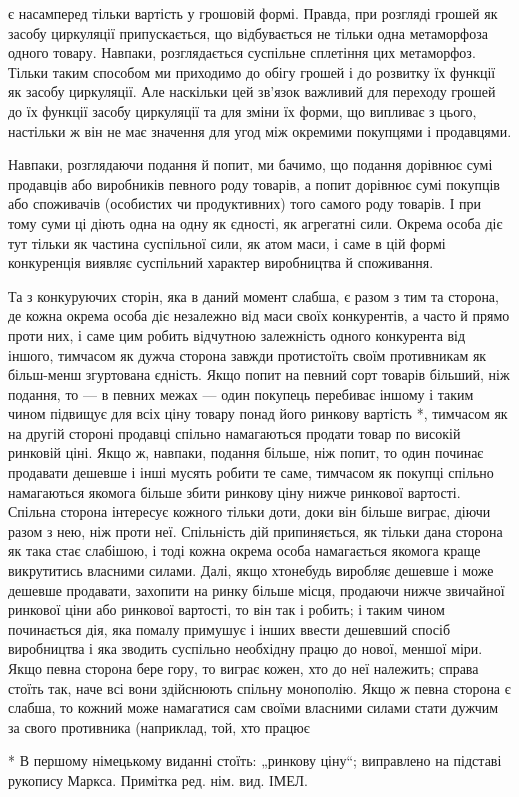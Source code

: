 є насамперед тільки вартість у грошовій формі. Правда, при
розгляді грошей як засобу циркуляції припускається, що відбувається
не тільки одна метаморфоза одного товару. Навпаки,
розглядається суспільне сплетіння цих метаморфоз. Тільки
таким способом ми приходимо до обігу грошей і до розвитку їх
функції як засобу циркуляції. Але наскільки цей зв’язок важливий
для переходу грошей до їх функції засобу циркуляції та
для зміни їх форми, що випливає з цього, настільки ж він не
має значення для угод між окремими покупцями і продавцями.

Навпаки, розглядаючи подання й попит, ми бачимо, що подання
дорівнює сумі продавців або виробників певного роду
товарів, а попит дорівнює сумі покупців або споживачів (особистих
чи продуктивних) того самого роду товарів. І при тому
суми ці діють одна на одну як єдності, як агрегатні сили. Окрема
особа діє тут тільки як частина суспільної сили, як атом маси,
і саме в цій формі конкуренція виявляє суспільний характер
виробництва й споживання.

Та з конкуруючих сторін, яка в даний момент слабша, є разом
з тим та сторона, де кожна окрема особа діє незалежно від маси
своїх конкурентів, а часто й прямо проти них, і саме цим робить
відчутною залежність одного конкурента від іншого, тимчасом
як дужча сторона завжди протистоїть своїм противникам як
більш-менш згуртована єдність. Якщо попит на певний сорт
товарів більший, ніж подання, то — в певних межах — один покупець
перебиває іншому і таким чином підвищує для всіх ціну
товару понад його ринкову вартість *, тимчасом як на другій
стороні продавці спільно намагаються продати товар по високій
ринковій ціні. Якщо ж, навпаки, подання більше, ніж попит,
то один починає продавати дешевше і інші мусять робити те саме,
тимчасом як покупці спільно намагаються якомога більше збити
ринкову ціну нижче ринкової вартості. Спільна сторона інтересує
кожного тільки доти, доки він більше виграє, діючи разом з нею,
ніж проти неї. Спільність дій припиняється, як тільки дана сторона
як така стає слабішою, і тоді кожна окрема особа намагається
якомога краще викрутитись власними силами. Далі,
якщо хтонебудь виробляє дешевше і може дешевше продавати,
захопити на ринку більше місця, продаючи нижче звичайної
ринкової ціни або ринкової вартості, то він так і робить; і таким
чином починається дія, яка помалу примушує і інших ввести
дешевший спосіб виробництва і яка зводить суспільно необхідну
працю до нової, меншої міри. Якщо певна сторона бере гору,
то виграє кожен, хто до неї належить; справа стоїть так, наче
всі вони здійснюють спільну монополію. Якщо ж певна сторона
є слабша, то кожний може намагатися сам своїми власними силами
стати дужчим за свого противника (наприклад, той, хто працює

* В першому німецькому виданні стоїть: „ринкову ціну“; виправлено на
підставі рукопису Маркса. Примітка ред. нім. вид. ІМЕЛ.
